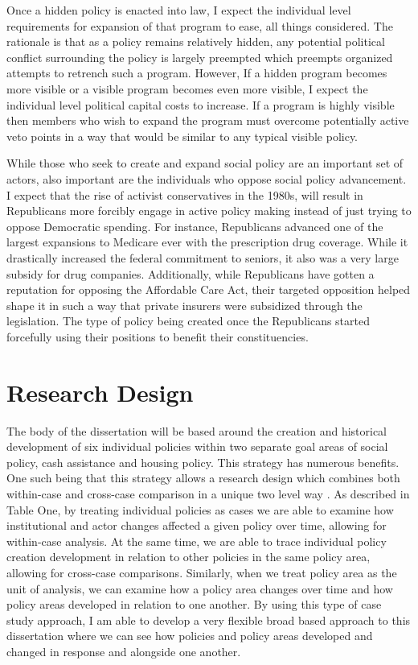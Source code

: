 \documentclass[12pt]{article}
\begin{document}
Once a hidden policy is enacted into law, I expect the individual level requirements for expansion of that program to ease, all things considered. The rationale is that as a policy remains relatively hidden, any potential political conflict surrounding the policy is largely preempted which preempts organized attempts to retrench such a program. However, If a hidden program becomes more visible or a visible program becomes even more visible, I expect the individual level political capital costs to increase. If a program is highly visible then members who wish to expand the program must overcome potentially active veto points in a way that would be similar to any typical visible policy.

While those who seek to create and expand social policy are an important set of actors, also important are the individuals who oppose social policy advancement. I expect that the rise of activist conservatives in the 1980s, will result in Republicans more forcibly engage in active policy making instead of just trying to oppose Democratic spending. For instance, Republicans advanced one of the largest expansions to Medicare ever with the prescription drug coverage. While it drastically increased the federal commitment to seniors, it also was a very large subsidy for drug companies. Additionally, while Republicans have gotten a reputation for opposing the Affordable Care Act, their targeted opposition helped shape it in such a way that private insurers were subsidized through the legislation. The type of policy being created once the Republicans started forcefully using their positions to benefit their constituencies.

\section{Research Design}
The body of the dissertation will be based around the creation and historical development of six individual policies within two separate goal areas of social policy, cash assistance and housing policy. This strategy has numerous benefits. One such being that this strategy allows a research design which combines both within-case and cross-case comparison in a unique two level way \citep{george2005, goertz2012}. As described in Table One, by treating individual policies as cases we are able to examine how institutional and actor changes affected a given policy over time, allowing for within-case analysis. At the same time, we are able to trace individual policy creation development in relation to other policies in the same policy area, allowing for cross-case comparisons. Similarly, when we treat policy area as the unit of analysis, we can examine how a policy area changes over time and how policy areas developed in relation to one another. By using this type of case study approach, I am able to develop a very flexible broad based approach to this dissertation where we can see how policies and policy areas developed and changed in response and alongside one another. 
\end{document}
